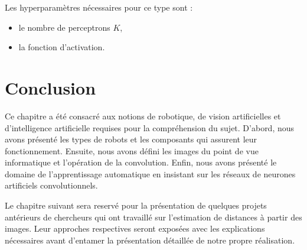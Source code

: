 Les hyperparamètres nécessaires pour ce type sont :

\begin{itemize}
  \item le nombre de perceptrons $K$,
  \item la fonction d'activation.
\end{itemize}

\section{Conclusion}

Ce chapitre a été consacré aux notions de robotique, de vision artificielles
et d'intelligence artificielle requises pour la compréhension du sujet.
D'abord, nous avons présenté les types de robots et les composants qui assurent leur
fonctionnement. Ensuite, nous avons défini les images du point de vue
informatique et l'opération de la convolution. Enfin, nous avons présenté le
domaine de l'apprentissage automatique en insistant sur les réseaux de
neurones artificiels convolutionnels.

Le chapitre suivant sera reservé pour la présentation de quelques projets antérieurs
de chercheurs qui ont travaillé sur l'estimation de distances à partir des images.
Leur approches respectives seront exposées avec les explications nécessaires avant
d'entamer la présentation détaillée de notre propre réalisation.

